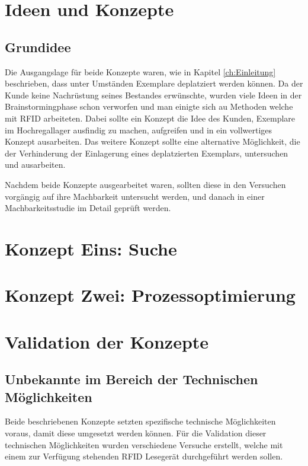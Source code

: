 \chapter{Ideen und Konzepte}

\section{Grundidee}
Die Ausgangslage für beide Konzepte waren, wie in Kapitel \ref{ch:Einleitung} beschrieben, dass unter Umständen Exemplare deplatziert werden können. Da der Kunde keine Nachrüstung seines Bestandes erwünschte, wurden viele Ideen in der Brainstormingphase schon verworfen und man einigte sich au Methoden welche mit RFID arbeiteten. Dabei sollte ein Konzept die Idee des Kunden, Exemplare im Hochregallager ausfindig zu machen, aufgreifen und in ein vollwertiges Konzept ausarbeiten. Das weitere Konzept sollte eine alternative Möglichkeit, die der Verhinderung der Einlagerung eines deplatzierten Exemplars, untersuchen und ausarbeiten.

Nachdem beide Konzepte ausgearbeitet waren, sollten diese in den Versuchen vorgängig auf ihre Machbarkeit untersucht werden, und danach in einer Machbarkeitsstudie im Detail geprüft werden.


\chapter{Konzept Eins: Suche}



\chapter{Konzept Zwei: Prozessoptimierung}



\chapter{Validation der Konzepte}

\section{Unbekannte im Bereich der Technischen Möglichkeiten}
Beide beschriebenen Konzepte setzten spezifische technische Möglichkeiten voraus, damit diese umgesetzt werden können. Für die Validation dieser technischen Möglichkeiten wurden verschiedene Versuche erstellt, welche mit einem zur Verfügung stehenden RFID Lesegerät durchgeführt werden sollen.

